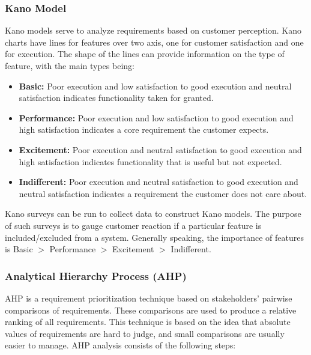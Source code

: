 \documentclass[12pt,titlepage]{article}
\begin{document}
      \subsubsection{Kano Model}
        Kano models serve to analyze requirements based on customer perception. Kano charts have lines for features over two axis, one for customer
        satisfaction and one for execution. The shape of the lines can provide information on the type of feature, with the main types being:
        \begin{itemize}
          \item \textbf{Basic:} Poor execution and low satisfaction to good execution and neutral satisfaction indicates functionality taken for granted.
          \item \textbf{Performance:} Poor execution and low satisfaction to good execution and high satisfaction indicates a core requirement
            the customer expects.
          \item \textbf{Excitement:} Poor execution and neutral satisfaction to good execution and high satisfaction indicates functionality
            that is useful but not expected.
          \item \textbf{Indifferent:} Poor execution and neutral satisfaction to good execution and neutral satisfaction indicates a requirement the
            customer does not care about.
        \end{itemize}

        Kano surveys can be run to collect data to construct Kano models. The purpose of such surveys is to gauge customer reaction if a particular feature is
        included/excluded from a system. Generally speaking, the importance of features is Basic $>$ Performance $>$ Excitement $>$ Indifferent.

      \subsubsection{Analytical Hierarchy Process (AHP)}
        AHP is a requirement prioritization technique based on stakeholders' pairwise comparisons of requirements. These comparisons are used to produce a relative
        ranking of all requirements. This technique is based on the idea that absolute values of requirements are hard to judge, and small comparisons are usually
        easier to manage. AHP analysis consists of the following steps:
\end{document}
